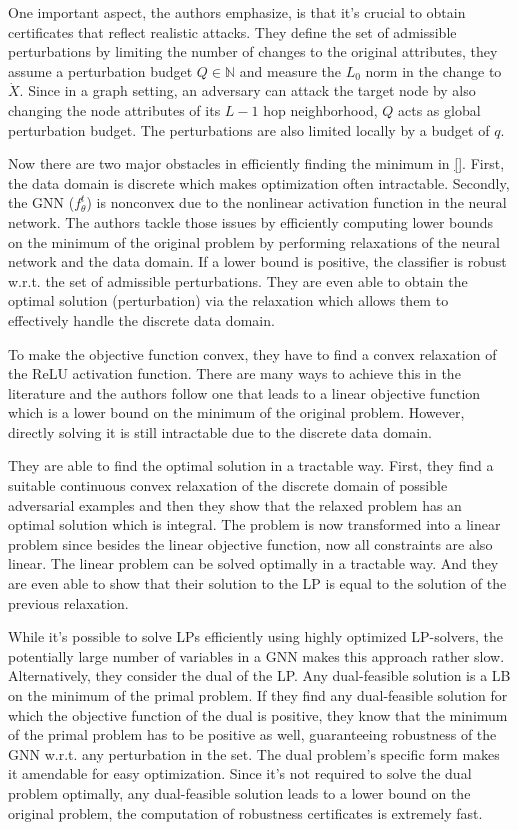 \documentclass[a4paper,preprint]{sig-alternate}
\begin{document}
One important aspect, the authors emphasize, is that it's crucial to obtain certificates that reflect realistic attacks.
They define the set of admissible perturbations by limiting the number of changes to the original attributes, they assume a perturbation
budget $Q \in \mathbb{N}$ and measure the $L_0$ norm in the change to $\dot{X}$. Since in a graph setting, an adversary can attack the target node
by also changing the node attributes of its $L-1$ hop neighborhood, $Q$ acts as global perturbation budget. The perturbations are also limited locally
by a budget of $q$.

Now there are two major obstacles in efficiently finding the minimum in \ref{}.
First, the data domain is discrete which makes optimization often intractable. Secondly, the GNN ($f_{\theta}^t$) is nonconvex
due to the nonlinear activation function in the neural network. The authors tackle those issues by efficiently computing lower bounds
on the minimum of the original problem by performing relaxations of the neural network and the data domain.
If a lower bound is positive, the classifier is robust w.r.t. the set of admissible perturbations.
They are even able to obtain the optimal solution (perturbation) via the relaxation which allows them to effectively handle the discrete data domain.

To make the objective function convex, they have to find a convex relaxation of the ReLU activation function. There are many ways to achieve this
in the literature and the authors follow one that leads to a linear objective function which is a lower bound on the minimum of the original problem.
However, directly solving it is still intractable due to the discrete data domain.

They are able to find the optimal solution in a tractable way. First, they find a suitable continuous convex relaxation of the discrete domain
of possible adversarial examples and then they show that the relaxed problem has an optimal solution which is integral.
The problem is now transformed into a linear problem since besides the linear objective function, now all constraints are also linear.
The linear problem can be solved optimally in a tractable way. And they are even able to show that their solution to the LP is equal to
the solution of the previous relaxation.

While it's possible to solve LPs efficiently using highly optimized LP-solvers, the potentially large number of variables in a GNN makes
this approach rather slow. Alternatively, they consider the dual of the LP. Any dual-feasible solution is a LB on the minimum of the primal problem.
If they find any dual-feasible solution for which the objective function of the dual is positive, they know that the minimum of the primal problem
has to be positive as well, guaranteeing robustness of the GNN w.r.t. any perturbation in the set. The dual problem's specific form makes it
amendable for easy optimization. Since it's not required to solve the dual problem optimally, any dual-feasible solution leads to a lower bound
on the original problem, the computation of robustness certificates is extremely fast.
\end{document}
